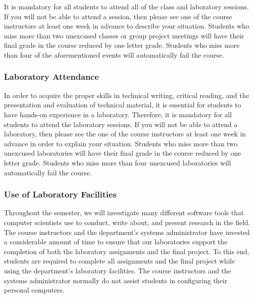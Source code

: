 
It is mandatory for all students to attend all of the class and laboratory sessions. If you will not be able to attend a
session, then please see one of the course instructors at least one week in advance to describe your situation.
Students who miss more than two unexcused classes or group project meetings will have their final grade in the course
reduced by one letter grade. Students who miss more than four of the aforementioned events will automatically fail the
course.

\vspace{-.20in}
\subsubsection*{Laboratory Attendance}

In order to acquire the proper skills in technical writing, critical reading, and the presentation and evaluation of
technical material, it is essential for students to have hands-on experience in a laboratory. Therefore, it is mandatory
for all students to attend the laboratory sessions. If you will not be able to attend a laboratory, then please see the
one of the course instructors at least one week in advance in order to explain your situation. Students who miss more
than two unexcused laboratories will have their final grade in the course reduced by one letter grade.  Students who
miss more than four unexcused laboratories will automatically fail the course.

\vspace{-.1in}
\subsubsection*{Use of Laboratory Facilities}

Throughout the semester, we will investigate many different software tools that computer scientists use to conduct,
write about, and present research in the field.  The course instructors and the department's systems administrator have
invested a considerable amount of time to ensure that our laboratories support the completion of both the laboratory
assignments and the final project.  To this end, students are required to complete all assignments and the final project
while using the department's laboratory facilities. The course instructors and the systems administrator normally do not
assist students in configuring their personal computers.

